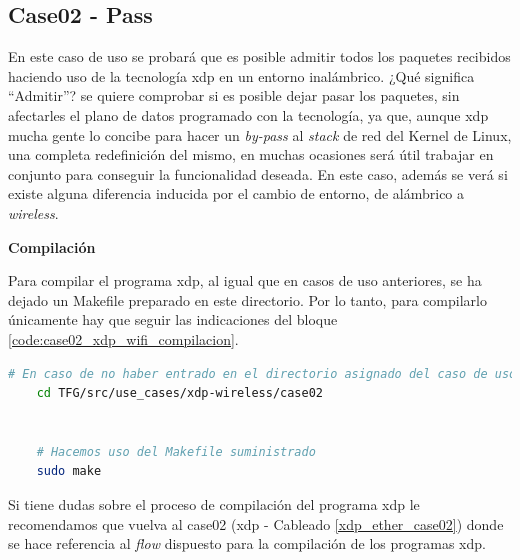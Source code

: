 \subsection{Case02 - Pass}
\label{xdp_wifi_case02}

En este caso de uso se probará que es posible admitir todos los paquetes recibidos haciendo uso de la tecnología \gls{xdp} en un entorno inalámbrico. ¿Qué significa ``Admitir”? se quiere comprobar si es posible dejar pasar los paquetes, sin afectarles el plano de datos programado con la tecnología, ya que, aunque \gls{xdp} mucha gente lo concibe para hacer un \textit{by-pass} al \textit{stack} de red del Kernel de Linux, una completa redefinición del mismo, en muchas ocasiones será útil trabajar en conjunto para conseguir la funcionalidad deseada. En este caso, además se verá si existe alguna diferencia inducida por el cambio de entorno, de alámbrico a \textit{wireless}.\\
\par


\vspace{0.5cm}
\textbf{Compilación}\\
\par

Para compilar el programa \gls{xdp}, al igual que en casos de uso anteriores, se ha dejado un Makefile preparado en este directorio. Por lo tanto, para compilarlo únicamente hay que seguir las indicaciones del bloque \ref{code:case02_xdp_wifi_compilacion}.\\
\par

\begin{lstlisting}[language= bash, style=Consola, caption={Compilación programa XDP - Case02},label=code:case02_xdp_wifi_compilacion]
    # En caso de no haber entrado en el directorio asignado del caso de uso
    cd TFG/src/use_cases/xdp-wireless/case02
    
    
    # Hacemos uso del Makefile suministrado 
    sudo make
\end{lstlisting}
\vspace{0.5cm}

Si tiene dudas sobre el proceso de compilación del programa \gls{xdp} le recomendamos que vuelva al case02 (\gls{xdp} - Cableado \ref{xdp_ether_case02}) donde se hace referencia al \textit{flow} dispuesto para la compilación de los programas \gls{xdp}.\\
\par



